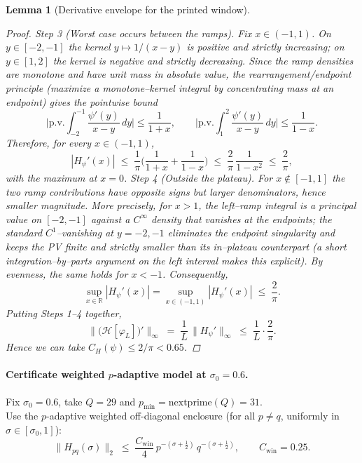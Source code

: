 \documentclass[11pt]{article}
\newtheorem{lemma}[theorem]{Lemma}
\theoremstyle{definition}
\theoremstyle{remark}
\begin{document}
\begin{lemma}[Derivative envelope for the printed window]
\begin{proof}
\smallskip
\textit{Step 3 (Worst case occurs between the ramps).} Fix $x\in(-1,1)$.  On $y\in[-2,-1]$ the kernel $y\mapsto 1/(x-y)$ is positive and strictly increasing; on $y\in[1,2]$ the kernel is negative and strictly decreasing.  Since the ramp densities are monotone and have unit mass in absolute value, the rearrangement/endpoint principle (maximize a monotone–kernel integral by concentrating mass at an endpoint) gives the pointwise bound
\[
  \Big|\mathrm{p.v.}\!\int_{-2}^{-1}\frac{\psi'(y)}{x-y}\,dy\Big|
  \le \frac{1}{1+x},\qquad
  \Big|\mathrm{p.v.}\!\int_{1}^{2}\frac{\psi'(y)}{x-y}\,dy\Big|
  \le \frac{1}{1-x}.
\]
Therefore, for every $x\in(-1,1)$,
\[
  |H_\psi'(x)| \;\le\; \frac{1}{\pi}\Big(\frac{1}{1+x}+\frac{1}{1-x}\Big)
  \;\le\; \frac{2}{\pi}\,\frac{1}{1-x^2}
  \;\le\; \frac{2}{\pi},
\]
with the maximum at $x=0$.
\smallskip
\textit{Step 4 (Outside the plateau).} For $x\notin[-1,1]$ the two ramp contributions have opposite signs but larger denominators, hence smaller magnitude. More precisely, for $x>1$, the left–ramp integral is a principal value on $[-2,-1]$ against a $C^\infty$ density that vanishes at the endpoints; the standard $C^1$–vanishing at $y=-2,-1$ eliminates the endpoint singularity and keeps the PV finite and strictly smaller than its in–plateau counterpart (a short integration–by–parts argument on the left interval makes this explicit). By evenness, the same holds for $x<-1$.  Consequently,
\[
  \sup_{x\in\mathbb R}|H_\psi'(x)|=\sup_{x\in(-1,1)}|H_\psi'(x)|\;\le\;\frac{2}{\pi}.
\]
Putting Steps 1–4 together,
\[
  \big\|\big(\mathcal H[\varphi_L]\big)'\big\|_\infty
  \;=\;\frac{1}{L}\,\|H_\psi'\|_\infty
  \;\le\;\frac{1}{L}\cdot\frac{2}{\pi}.
\]
Hence we can take $C_H(\psi)\le 2/\pi < 0.65$.
\end{proof}

\end{lemma}


\paragraph*{Certificate \textemdash{} weighted \(p\)-adaptive model at \(\sigma_0=0.6\).}
Fix \(\sigma_0=0.6\), take \(Q=29\) and \(p_{\min}=\mathrm{nextprime}(Q)=31\).\\
Use the \(p\)-adaptive weighted off-diagonal enclosure (for all \(p\neq q\), uniformly in \(\sigma\in[\sigma_0,1]\)):
\[
\|H_{pq}(\sigma)\|_2 \;\le\; \frac{C_{\mathrm{win}}}{4}\, p^{-(\sigma+\tfrac12)}\, q^{-(\sigma+\tfrac12)},
\qquad C_{\mathrm{win}}=0.25.
\]
\end{document}
